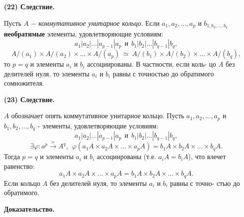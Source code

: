 \documentclass{mai_book}
\begin{document}
	\noindent
	{\bf (22) Следствие.}
	
	Пусть $A$ $-$ {\it коммутативное унитарное кольцо}. Если $a_{1}, a_{2}, \ldots, a_{p}$ и\linebreak
	$b_{1, b_{2}, \ldots, b_{q}}$ {\bf необратимые} элементы, удовлетворяющие условиям:
	$$a_{1} |a_{2}|\ldots |a_{p - 1}|a_{p} \ \ \text{и} \ \ b_{1} |b_{2}|\ldots |b_{q - 1}|b_{q},$$
	$$A/(a_{1}) \times A/(a_{2}) \times \ldots \times A/(a_{p}) \ \simeq \ A/(b_{1}) \times A/(b_{2}) \times \ldots \times A/(b_{q}),$$
	то $p = q$ и элементы $a_{i}$ и $b_{i}$ ассоциированы. В частности, если коль-\linebreak
	цо $A$ без делителей нуля, то элементы $a_{i}$ и $b_{i}$ равны с точностью до\linebreak
	обратимого сомножителя.
	
	\noindent
	{\bf (23) Следствие.}
	
	$A$ обозначает опять коммутативное унитарное кольцо. Пусть\linebreak
	$a_{1}, a_{2}, \ldots, a_{p}$ и $b_{1}, b_{2}, \ldots, b_{q}$ - элементы, удовлетворяющие условиям:\linebreak
	$$a_{1} |a_{2}|\ldots |a_{p - 1}|a_{p} \ \ \text{и} \ \ b_{1} |b_{2}|\ldots |b_{q - 1}|b_{q},$$
	$$\exists \varphi : a^{p} \xrightarrow{\simeq} A^{q}, \ \ \varphi (a_{1}A \times a_{2}A \times \ldots \times a_{p}A) = b_{1}A \times b_{2}A \times \ldots \times b_{q}A.$$
	Тогда $p = q$ и элементы $a_{i}$ и $b_{i}$ ассоциированы (т.е. $a_{i}A = b_{i}A$), что\linebreak
	влечет равенство:
	$$a_{1}A \times a_{2}A \times \ldots \times a_{p}A = b_{1}A \times b_{2}A \times \ldots \times b_{q}A.$$
	Если кольцо $A$ без делителей нуля, то элементы $a_{i}$ и $b_{i}$ равны с точно-\linebreak
	стью до обратимого.

	\pagebreak
	

	\noindent
	{\bf Доказательство.}
	
\end{document}
